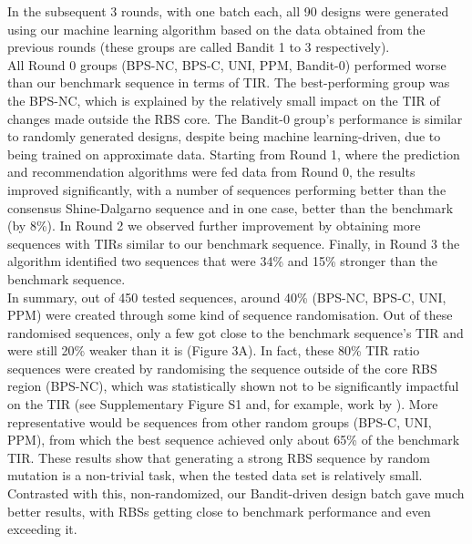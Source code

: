 \documentclass{article}
\begin{document}
In the subsequent 3 rounds, with one batch each, all 90 designs were generated using our machine learning algorithm based on the data obtained from the previous rounds (these groups are called Bandit 1 to 3 respectively).\\

All Round 0 groups (BPS-NC, BPS-C, UNI, PPM, Bandit-0) performed worse than our benchmark sequence in terms of TIR.
The best-performing group was the BPS-NC, which is explained by the relatively small impact on the TIR of changes made outside the RBS core.
The Bandit-0 group's performance is similar to randomly generated designs, despite being machine learning-driven, due to being trained on approximate data.
Starting from Round 1, where the prediction and recommendation algorithms were fed data from Round 0, the results improved significantly, with a number of sequences performing better than the consensus Shine-Dalgarno sequence and in one case, better than the benchmark (by 8\%).
In Round 2 we observed further improvement by obtaining more sequences with TIRs similar to our benchmark sequence.
Finally, in Round 3 the algorithm identified two sequences that were 34\% and 15\% stronger than the benchmark sequence.\\

In summary, out of 450 tested sequences, around 40\% (BPS-NC, BPS-C, UNI, PPM) were created through some kind of sequence randomisation. Out of these randomised sequences, only a few got close to the benchmark sequence's TIR and were still 20\% weaker than it is (Figure 3A). In fact, these 80\% TIR ratio sequences were created by randomising the sequence outside of the core RBS region (BPS-NC), which was statistically shown not to be significantly impactful on the TIR (see Supplementary Figure S1 and, for example, work by \mbox{\textcite{Jeschek2016}}). More representative would be sequences from other random groups (BPS-C, UNI, PPM), from which the best sequence achieved only about 65\% of the benchmark TIR.
These results show that generating a strong RBS sequence by random mutation is a non-trivial task, when the tested data set is relatively small.
Contrasted with this, non-randomized, our Bandit-driven design batch gave much better results, with RBSs getting close to benchmark performance and even exceeding it.\\
\end{document}
